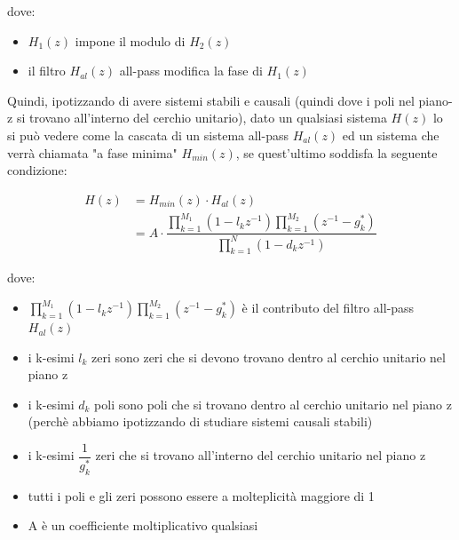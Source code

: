 dove: 

\begin{itemize}
    \item $H_1 \left(z\right)$ impone il modulo di $H_2 \left(z\right)$
    \item il filtro $H_{al} \left(z\right)$ all-pass modifica la fase di $H_1 \left(z\right)$
\end{itemize}

Quindi, ipotizzando di avere sistemi stabili e causali (quindi dove i poli nel piano-z si trovano all'interno del cerchio unitario), 
dato un qualsiasi sistema $H \left(z\right)$ lo si può vedere come la cascata di un sistema all-pass $H_{al} \left(z\right)$ ed un sistema che verrà chiamata "a fase minima" $H_{min} \left(z\right)$, 
se quest'ultimo soddisfa la seguente condizione: 

{
    \Large 
    \begin{equation}
        \begin{split}
            H \left(z\right) 
            &= 
            H_{min} \left(z\right) \cdot H_{al} \left(z\right)
            \\
            &=
            A \cdot 
            \dfrac{
                \prod_{k = 1}^{M_1} \left(1 - l_k z^{-1}\right) 
                \prod_{k = 1}^{M_2} \left(z^{-1} - g_k^{*}\right)
            }{\prod_{k = 1}^{N} \left(1 - d_k z^{-1}\right)}
        \end{split}
    \end{equation}
}

dove: 

\begin{itemize}
    \item $\prod_{k = 1}^{M_1} \left(1 - l_k z^{-1}\right) \prod_{k = 1}^{M_2} \left(z^{-1} - g_k^{*}\right)$ è il contributo del filtro all-pass $H_{al} \left(z\right)$ 
    \item i k-esimi $l_k$ zeri sono zeri che si devono trovano dentro al cerchio unitario nel piano z 
    \item i k-esimi $d_k$ poli sono poli che si trovano dentro al cerchio unitario nel piano z (perchè abbiamo ipotizzando di studiare sistemi causali stabili)
    \item i k-esimi $\dfrac{1}{g_k^{*}}$ zeri che si trovano all'interno del cerchio unitario nel piano z
    \item tutti i poli e gli zeri possono essere a molteplicità maggiore di 1
    \item A è un coefficiente moltiplicativo qualsiasi   
\end{itemize}

